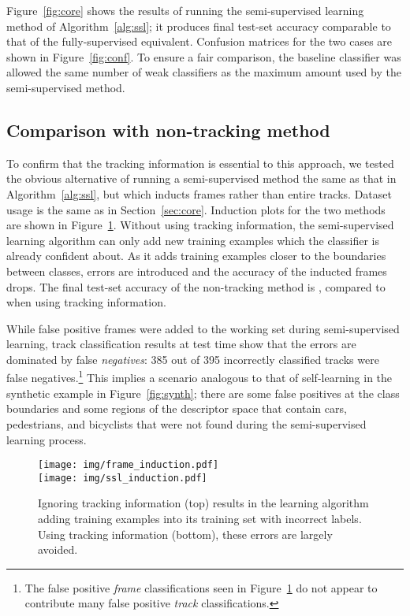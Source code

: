 \documentclass[conference]{IEEEtran}
\begin{document}
Figure~\ref{fig:core} shows the results of running the semi-supervised learning method of Algorithm~\ref{alg:ssl}; it produces final test-set accuracy comparable to that of the fully-supervised equivalent.  Confusion matrices for the two cases are shown in Figure~\ref{fig:conf}.  To ensure a fair comparison, the baseline classifier was allowed the same number of weak classifiers as the maximum amount used by the semi-supervised method.

\subsection{Comparison with non-tracking method}

To confirm that the tracking information is essential to this approach, we tested the obvious alternative of running a semi-supervised method the same as that in Algorithm~\ref{alg:ssl}, but which inducts frames rather than entire tracks.  Dataset usage is the same as in Section~\ref{sec:core}.  Induction plots for the two methods are shown in Figure~\ref{fig:tracking_vs_not}.  Without using tracking information, the semi-supervised learning algorithm can only add new training examples which the classifier is already confident about.  As it adds training examples closer to the boundaries between classes, errors are introduced and the accuracy of the inducted frames drops.  The final test-set accuracy of the non-tracking method is , compared to  when using tracking information.

While false positive frames were added to the working set during semi-supervised learning, track classification results at test time show that the errors are dominated by false \textit{negatives}: 385 out of 395 incorrectly classified tracks were false negatives.\footnote{The false positive \textit{frame} classifications seen in Figure~\ref{fig:tracking_vs_not} do not appear to contribute many false positive \textit{track} classifications.}  This implies a scenario analogous to that of self-learning in the synthetic example in Figure~\ref{fig:synth}; there are some false positives at the class boundaries and some regions of the descriptor space that contain cars, pedestrians, and bicyclists that were not found during the semi-supervised learning process.

\begin{figure}
  \centering
  \texttt{[image: img/frame\_induction.pdf]} \\
  \vspace{0.1in}
  \texttt{[image: img/ssl\_induction.pdf]}
  \caption{Ignoring tracking information (top) results in the learning algorithm adding training examples into its training set with incorrect labels.  Using tracking information (bottom), these errors are largely avoided.}
  \label{fig:tracking_vs_not}
\end{figure}
\end{document}
